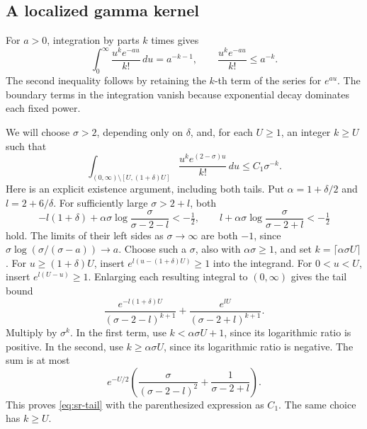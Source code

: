 \subsection{A localized gamma kernel}
For \(a>0\), integration by parts \(k\) times gives
\[
 \int_0^\infty\frac{u^k e^{-au}}{k!}\,du=a^{-k-1},\qquad
 \frac{u^k e^{-au}}{k!}\leq a^{-k}.
\]
The second inequality follows by retaining the \(k\)-th term of the
series for \(e^{au}\). The boundary terms in the integration vanish
because exponential decay dominates each fixed power.

We will choose \(\sigma>2\), depending only on \(\delta\), and, for each
\(U\geq1\), an integer \(k\geq U\) such that
\begin{equation}\label{eq:sr-tail}
 \int_{(0,\infty)\setminus[U,(1+\delta)U]}
       \frac{u^k e^{(2-\sigma)u}}{k!}\,du
 \leq C_1\sigma^{-k}.
\end{equation}
Here is an explicit existence argument, including both tails.
Put \(\alpha=1+\delta/2\) and \(l=2+6/\delta\).
For sufficiently large \(\sigma>2+l\), both
\[
 -l(1+\delta)+\alpha\sigma
       \log\frac{\sigma}{\sigma-2-l}<-\tfrac12,\qquad
 l+\alpha\sigma\log\frac{\sigma}{\sigma-2+l}<-\tfrac12
\]
hold. The limits of their left sides as \(\sigma\to\infty\) are both
\(-1\), since \(\sigma\log(\sigma/(\sigma-a))\to a\).
Choose such a \(\sigma\), also with \(\alpha\sigma\geq1\), and set
\(k=\lceil\alpha\sigma U\rceil\).
For \(u\geq(1+\delta)U\), insert \(e^{l(u-(1+\delta)U)}\geq1\)
into the integrand. For \(0<u<U\), insert \(e^{l(U-u)}\geq1\).
Enlarging each resulting integral to \((0,\infty)\) gives the tail bound
\[
 \frac{e^{-l(1+\delta)U}}{(\sigma-2-l)^{k+1}}
 +\frac{e^{lU}}{(\sigma-2+l)^{k+1}}.
\]
Multiply by \(\sigma^k\).
In the first term, use \(k<\alpha\sigma U+1\), since its logarithmic
ratio is positive. In the second, use \(k\geq\alpha\sigma U\), since
its logarithmic ratio is negative. The sum is at most
\[
 e^{-U/2}\left(
 \frac{\sigma}{(\sigma-2-l)^2}+\frac1{\sigma-2+l}\right).
\]
This proves \eqref{eq:sr-tail} with the parenthesized expression as
\(C_1\). The same choice has \(k\geq U\).

